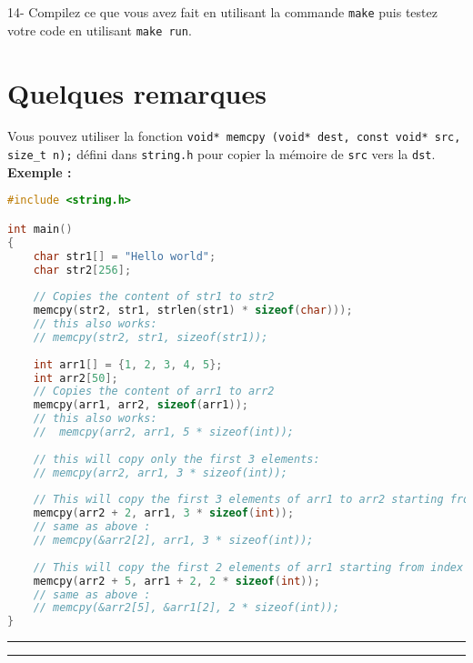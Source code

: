 \documentclass[a4paper]{article}
\begin{document}
	14- Compilez ce que vous avez fait en utilisant la commande \texttt{make} puis testez votre code en utilisant \texttt{make run}.
	
	\section*{Quelques remarques}
	Vous pouvez utiliser la fonction \texttt{void* memcpy (void* dest, const void* src, size\_t n);} défini dans \texttt{string.h} pour copier la mémoire de \texttt{src} vers la \texttt{dst}. \\
	\textbf{Exemple :}
	\begin{lstlisting}[language=C]
#include <string.h>

int main()
{
	char str1[] = "Hello world";
	char str2[256];
	
	// Copies the content of str1 to str2
	memcpy(str2, str1, strlen(str1) * sizeof(char)));
	// this also works: 
	// memcpy(str2, str1, sizeof(str1));
	
	int arr1[] = {1, 2, 3, 4, 5};
	int arr2[50];
	// Copies the content of arr1 to arr2
	memcpy(arr1, arr2, sizeof(arr1));
	// this also works:
	//  memcpy(arr2, arr1, 5 * sizeof(int));
	
	// this will copy only the first 3 elements:
	// memcpy(arr2, arr1, 3 * sizeof(int));
	
	// This will copy the first 3 elements of arr1 to arr2 starting from index 2
	memcpy(arr2 + 2, arr1, 3 * sizeof(int));
	// same as above :
	// memcpy(&arr2[2], arr1, 3 * sizeof(int));
	
	// This will copy the first 2 elements of arr1 starting from index 2 to arr2 starting from index 5
	memcpy(arr2 + 5, arr1 + 2, 2 * sizeof(int));
	// same as above :
	// memcpy(&arr2[5], &arr1[2], 2 * sizeof(int));
}
	\end{lstlisting}

	\par\noindent\rule{\textwidth}{0.4pt}
	\par\noindent\rule{\textwidth}{0.4pt}
\end{document}
